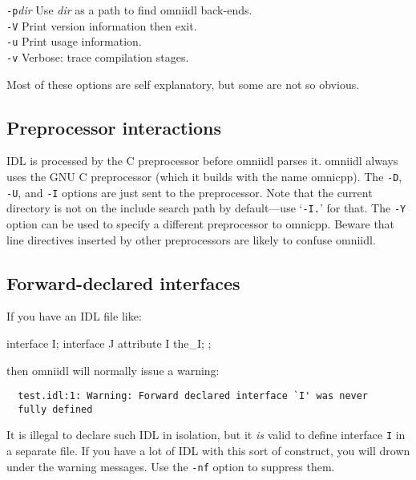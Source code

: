 \documentclass[11pt,oneside,a4paper]{book}
\newcommand{\intf}[1]{\texttt{#1}}
\newcommand{\cmdline}[1]{\texttt{#1}}
\begin{document}
\begin{tabbing}
\cmdline{-p}\textit{dir}
     \> Use \textit{dir} as a path to find omniidl back-ends.\\

\cmdline{-V}
     \> Print version information then exit.\\

\cmdline{-u}
     \> Print usage information.\\

\cmdline{-v}
     \> Verbose: trace compilation stages.\\

\end{tabbing}

\noindent Most of these options are self explanatory, but some are not
so obvious.

\subsection{Preprocessor interactions}

IDL is processed by the C preprocessor before omniidl parses it.
omniidl always uses the GNU C preprocessor (which it builds with the
name omnicpp). The \cmdline{-D}, \cmdline{-U}, and \cmdline{-I}
options are just sent to the preprocessor. Note that the current
directory is not on the include search path by default---use
`\cmdline{-I.}' for that. The \cmdline{-Y} option can be used to
specify a different preprocessor to omnicpp. Beware that line
directives inserted by other preprocessors are likely to confuse
omniidl.

\subsection{Forward-declared interfaces}

If you have an IDL file like:

\begin{idllisting}
interface I;
interface J {
  attribute I the_I;
};
\end{idllisting}

\noindent then omniidl will normally issue a warning:

{\small
\begin{verbatim}
  test.idl:1: Warning: Forward declared interface `I' was never
  fully defined
\end{verbatim}
}

\noindent It is illegal to declare such IDL in isolation, but it
\emph{is} valid to define interface \intf{I} in a separate file. If
you have a lot of IDL with this sort of construct, you will drown
under the warning messages. Use the \cmdline{-nf} option to suppress
them.
\end{document}

